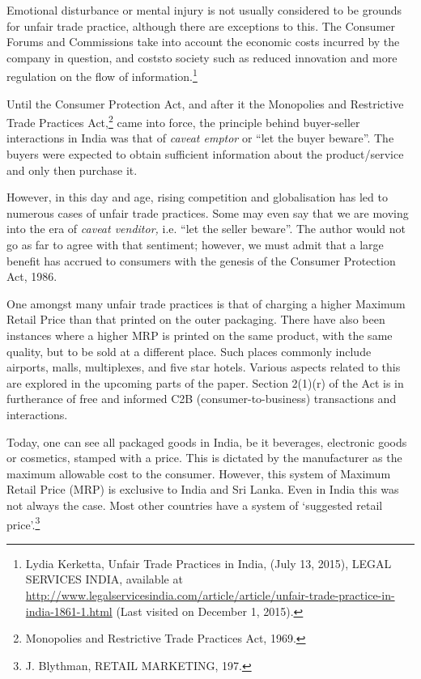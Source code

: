 \begin{multicols}{2}
\vspace{-.15cm}

\noi
Emotional disturbance or mental injury is not usually considered to be grounds for unfair trade
practice, although there are exceptions to this. The Consumer Forums and Commissions take
into account the economic costs incurred by the company in question, and coststo society such
as reduced innovation and more regulation on the flow of information.\footnote{Lydia Kerketta, Unfair Trade Practices in India, (July 13, 2015), LEGAL SERVICES INDIA, available at  \url{http://www.legalservicesindia.com/article/article/unfair-trade-practice-in-india-1861-1.html} (Last visited on
December 1, 2015).}

\noi
Until the Consumer Protection Act, and after it the Monopolies and Restrictive Trade Practices Act,\footnote{Monopolies and Restrictive Trade Practices Act, 1969.} came into force, the principle behind buyer-seller interactions in India was that of \textit{caveat emptor} or “let the buyer beware”. The buyers were expected to obtain sufficient information about the product/service and only then purchase it.

\noi
However, in this day and age, rising competition and globalisation has led to numerous cases
of unfair trade practices. Some may even say that we are moving into the era of \textit{caveat venditor,}
i.e. “let the seller beware”. The author would not go as far to agree with that sentiment;
however, we must admit that a large benefit has accrued to consumers with the genesis of the
Consumer Protection Act, 1986.

\noi
One amongst many unfair trade practices is that of charging a higher Maximum Retail Price
than that printed on the outer packaging. There have also been instances where a higher MRP
is printed on the same product, with the same quality, but to be sold at a different place. Such
places commonly include airports, malls, multiplexes, and five star hotels. Various aspects related to this are explored in the upcoming parts of the paper. Section 2(1)(r) of the Act is in
furtherance of free and informed C2B (consumer-to-business) transactions and interactions.

\vspace{-.1cm}


\vspace{-.1cm}

\noi
Today, one can see all packaged goods in India, be it beverages, electronic goods or cosmetics,
stamped with a price. This is dictated by the manufacturer as the maximum allowable cost to
the consumer. However, this system of Maximum Retail Price (MRP) is exclusive to India and
Sri Lanka. Even in India this was not always the case. Most other countries have a system of
‘suggested retail price’.\footnote{J. Blythman, RETAIL MARKETING, 197.}


\end{multicols}
